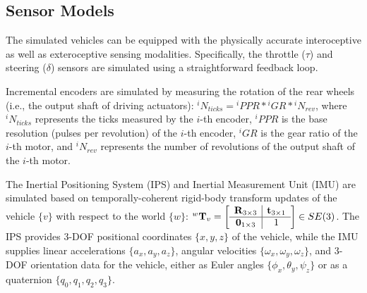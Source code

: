 \documentclass[letterpaper, 10 pt, conference]{ieeeconf}  %
\begin{document}
\subsection{Sensor Models}
\label{Sub-Section: Sensor Models}

The simulated vehicles can be equipped with the physically accurate interoceptive as well as exteroceptive sensing modalities. Specifically, the throttle ($\tau$) and steering ($\delta$) sensors are simulated using a straightforward feedback loop.

Incremental encoders are simulated by measuring the rotation of the rear wheels (i.e., the output shaft of driving actuators): $^iN_{ticks} = {^iPPR} * {^iGR} * {^iN_{rev}}$, where $^iN_{ticks}$ represents the ticks measured by the $i$-th encoder, $^iPPR$ is the base resolution (pulses per revolution) of the $i$-th encoder, $^iGR$ is the gear ratio of the $i$-th motor, and $^iN_{rev}$ represents the number of revolutions of the output shaft of the $i$-th motor.

The Inertial Positioning System (IPS) and Inertial Measurement Unit (IMU) are simulated based on temporally-coherent rigid-body transform updates of the vehicle $\{v\}$ with respect to the world $\{w\}$: ${^w\mathbf{T}_v} = \left[\begin{array}{c | c} \mathbf{R}_{3 \times 3} & \mathbf{t}_{3 \times 1} \\ \hline \mathbf{0}_{1 \times 3} & 1 \end{array}\right] \in SE(3)$. The IPS provides 3-DOF positional coordinates $\{x,y,z\}$ of the vehicle, while the IMU supplies linear accelerations $\{a_x,a_y,a_z\}$, angular velocities $\{\omega_x,\omega_y,\omega_z\}$, and 3-DOF orientation data for the vehicle, either as Euler angles $\{\phi_x,\theta_y,\psi_z\}$ or as a quaternion $\{q_0,q_1,q_2,q_3\}$.
\end{document}
